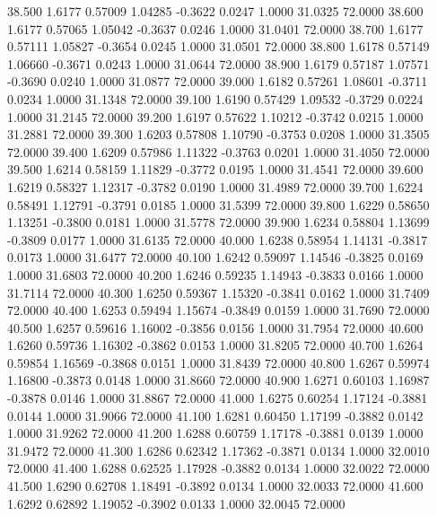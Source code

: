   38.500   1.6177   0.57009   1.04285  -0.3622   0.0247   1.0000  31.0325  72.0000
  38.600   1.6177   0.57065   1.05042  -0.3637   0.0246   1.0000  31.0401  72.0000
  38.700   1.6177   0.57111   1.05827  -0.3654   0.0245   1.0000  31.0501  72.0000
  38.800   1.6178   0.57149   1.06660  -0.3671   0.0243   1.0000  31.0644  72.0000
  38.900   1.6179   0.57187   1.07571  -0.3690   0.0240   1.0000  31.0877  72.0000
  39.000   1.6182   0.57261   1.08601  -0.3711   0.0234   1.0000  31.1348  72.0000
  39.100   1.6190   0.57429   1.09532  -0.3729   0.0224   1.0000  31.2145  72.0000
  39.200   1.6197   0.57622   1.10212  -0.3742   0.0215   1.0000  31.2881  72.0000
  39.300   1.6203   0.57808   1.10790  -0.3753   0.0208   1.0000  31.3505  72.0000
  39.400   1.6209   0.57986   1.11322  -0.3763   0.0201   1.0000  31.4050  72.0000
  39.500   1.6214   0.58159   1.11829  -0.3772   0.0195   1.0000  31.4541  72.0000
  39.600   1.6219   0.58327   1.12317  -0.3782   0.0190   1.0000  31.4989  72.0000
  39.700   1.6224   0.58491   1.12791  -0.3791   0.0185   1.0000  31.5399  72.0000
  39.800   1.6229   0.58650   1.13251  -0.3800   0.0181   1.0000  31.5778  72.0000
  39.900   1.6234   0.58804   1.13699  -0.3809   0.0177   1.0000  31.6135  72.0000
  40.000   1.6238   0.58954   1.14131  -0.3817   0.0173   1.0000  31.6477  72.0000
  40.100   1.6242   0.59097   1.14546  -0.3825   0.0169   1.0000  31.6803  72.0000
  40.200   1.6246   0.59235   1.14943  -0.3833   0.0166   1.0000  31.7114  72.0000
  40.300   1.6250   0.59367   1.15320  -0.3841   0.0162   1.0000  31.7409  72.0000
  40.400   1.6253   0.59494   1.15674  -0.3849   0.0159   1.0000  31.7690  72.0000
  40.500   1.6257   0.59616   1.16002  -0.3856   0.0156   1.0000  31.7954  72.0000
  40.600   1.6260   0.59736   1.16302  -0.3862   0.0153   1.0000  31.8205  72.0000
  40.700   1.6264   0.59854   1.16569  -0.3868   0.0151   1.0000  31.8439  72.0000
  40.800   1.6267   0.59974   1.16800  -0.3873   0.0148   1.0000  31.8660  72.0000
  40.900   1.6271   0.60103   1.16987  -0.3878   0.0146   1.0000  31.8867  72.0000
  41.000   1.6275   0.60254   1.17124  -0.3881   0.0144   1.0000  31.9066  72.0000
  41.100   1.6281   0.60450   1.17199  -0.3882   0.0142   1.0000  31.9262  72.0000
  41.200   1.6288   0.60759   1.17178  -0.3881   0.0139   1.0000  31.9472  72.0000
  41.300   1.6286   0.62342   1.17362  -0.3871   0.0134   1.0000  32.0010  72.0000
  41.400   1.6288   0.62525   1.17928  -0.3882   0.0134   1.0000  32.0022  72.0000
  41.500   1.6290   0.62708   1.18491  -0.3892   0.0134   1.0000  32.0033  72.0000
  41.600   1.6292   0.62892   1.19052  -0.3902   0.0133   1.0000  32.0045  72.0000
